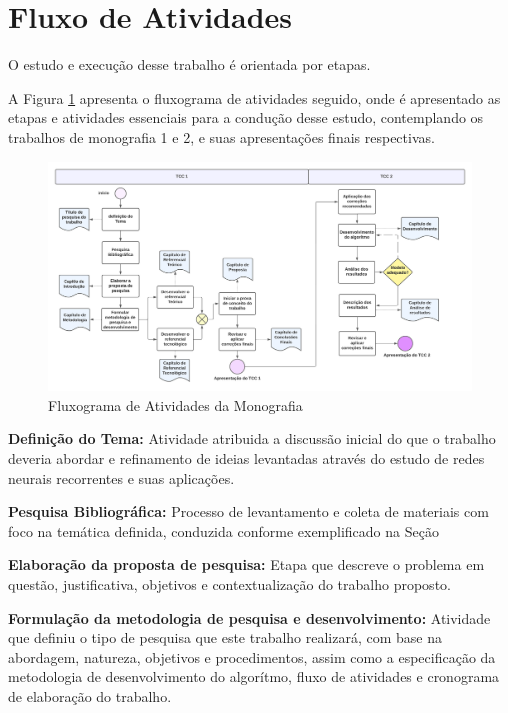 \section{Fluxo de Atividades}
\label{fa}

O estudo e execução desse trabalho é orientada por etapas.

A Figura \ref{fluxo_atv} apresenta o fluxograma de atividades seguido, onde é apresentado as etapas e atividades essenciais para a condução desse estudo, contemplando os trabalhos de monografia 1 e 2, e suas apresentações finais respectivas.

\begin{figure}[H]
	\centering
	\label{fluxo_atv}
		\includegraphics[keepaspectratio=true,scale=0.4]{figuras/fluxo_atv.png}
	\caption{Fluxograma de Atividades da Monografia}
\end{figure}

\textbf{Definição do Tema:} Atividade atribuida a discussão inicial do que o trabalho deveria abordar e refinamento de ideias levantadas através do estudo de redes neurais recorrentes e suas aplicações.

\textbf{Pesquisa Bibliográfica:} Processo de levantamento e coleta de materiais com foco na temática definida, conduzida conforme exemplificado na Seção  

\textbf{Elaboração da proposta de pesquisa:} Etapa que descreve o problema em questão, justificativa, objetivos e contextualização do trabalho proposto.

\textbf{Formulação da metodologia de pesquisa e desenvolvimento:} Atividade que definiu o tipo de pesquisa que este trabalho realizará, com base na abordagem, natureza, objetivos e procedimentos, assim como a especificação da metodologia de desenvolvimento do algorítmo, fluxo de atividades e cronograma de elaboração do trabalho.

